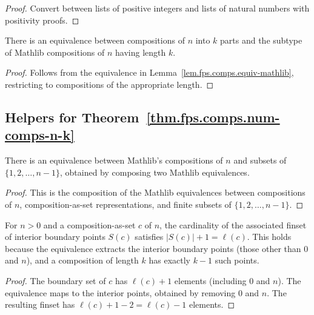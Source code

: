 \begin{proof}
\leanok
Convert between lists of positive integers and lists of natural numbers
with positivity proofs.
\end{proof}

\begin{lemma}
\label{lem.fps.comps.equiv-mathlib-filtered}
\leanhelper
\leanok
There is an equivalence between compositions of $n$ into $k$ parts
and the subtype of Mathlib compositions of $n$ having length $k$.
\end{lemma}

\begin{proof}
\leanok
Follows from the equivalence in Lemma~\ref{lem.fps.comps.equiv-mathlib},
restricting to compositions of the appropriate length.
\end{proof}

\subsection{Helpers for Theorem~\ref{thm.fps.comps.num-comps-n-k}}

\begin{lemma}
\label{lem.fps.comps.compositionToFinset}
\leanhelper
\leanok
There is an equivalence between Mathlib's compositions of $n$ and
subsets of $\{1, 2, \ldots, n-1\}$,
obtained by composing two Mathlib equivalences.
\end{lemma}

\begin{proof}
\leanok
This is the composition of the Mathlib equivalences
between compositions of $n$, composition-as-set representations,
and finite subsets of $\{1, 2, \ldots, n-1\}$.
\end{proof}

\begin{lemma}
\label{lem.fps.comps.compositionAsSetEquiv-card}
\leanhelper
\leanok
For $n > 0$ and a composition-as-set $c$ of $n$, the cardinality of the
associated finset of interior boundary points $S(c)$ satisfies
$|S(c)| + 1 = \ell(c)$.
This holds because the equivalence extracts the interior boundary points
(those other than $0$ and $n$), and a composition of length $k$ has exactly
$k - 1$ such points.
\end{lemma}

\begin{proof}
The boundary set of $c$ has $\ell(c) + 1$ elements (including $0$ and $n$).
The equivalence maps to the interior points, obtained by removing $0$ and $n$.
The resulting finset has $\ell(c) + 1 - 2 = \ell(c) - 1$ elements.
\end{proof}

